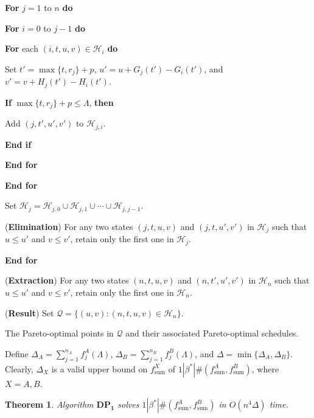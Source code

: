 \documentclass[12pt]{article}
\newtheorem{theorem}{Theorem}[section]
\begin{document}
\begin{sloppypar}
\begin{description}
\textbf{For} $j=1$ to $n$ \textbf{do}

\quad \textbf{For} $i=0$ to $j-1$ \textbf{do}

\qquad  \textbf{For} each $(i, t, u, v) \in \mathcal{H}_i$ \textbf{do} 

\quad \qquad Set $t'=\max\{t, r_j\}+p$, $u'=u+G_j(t')-G_i(t')$, and $v'=v+H_j(t')-H_i(t')$.

\quad \qquad \textbf{If} $\max\{t, r_j\}+p \leq \Lambda$, \textbf{then} 

\quad \qquad \qquad Add $(j, t', u', v')$ to $\mathcal{H}_{j,i}$.

\quad \qquad \textbf{End if}

\qquad \textbf{End for}

\quad \textbf{End for}

\quad Set $\mathcal{H}_j=\mathcal{H}_{j,0} \cup \mathcal{H}_{j,1} \cup \cdots \cup \mathcal{H}_{j,j-1}$.

\quad (\textbf{Elimination}) For any two states $(j, t, u, v)$ and $(j, t, u', v')$ in $\mathcal{H}_j$ such that $u \leq u'$ and $v \leq v'$,
retain only the first one in $\mathcal{H}_j$.

\textbf{End for}

\item [Step 4.] (\textbf{Extraction}) For any two states $(n, t, u, v)$ and $(n, t', u', v')$ in $\mathcal{H}_n$ such that $u \leq u'$ and $v \leq v'$, retain only the first one in $\mathcal{H}_n$.

\item [Step 5.] (\textbf{Result}) Set $\mathcal{Q}=\{(u, v): (n, t, u, v) \in \mathcal{H}_n\}$.

\item [Output:] The Pareto-optimal points in $\mathcal{Q}$ and their associated Pareto-optimal schedules.
\end{description}

Define $\Delta_A=\sum_{j=1}^{n_A} f_j^A(\Lambda)$, $\Delta_B=\sum_{j=1}^{n_B} f_j^B(\Lambda)$, and $\Delta=\min \{\Delta_A, \Delta_B\}$.
Clearly, $\Delta_X$ is a valid upper bound on $f_{\mathrm{sum}}^X$ of $1 | \beta^{*}|\#(f_{\mathrm{sum}}^A, f_{\mathrm{sum}}^B)$, where $X=A, B$.

\begin{theorem} \label{T-5.1}
Algorithm $\mathbf{DP_1}$ solves $1 | \beta^{*}|\#(f_{\mathrm{sum}}^A, f_{\mathrm{sum}}^B)$ in $O(n^4 \Delta)$ time.
\end{theorem}


\end{sloppypar}
\end{document}
